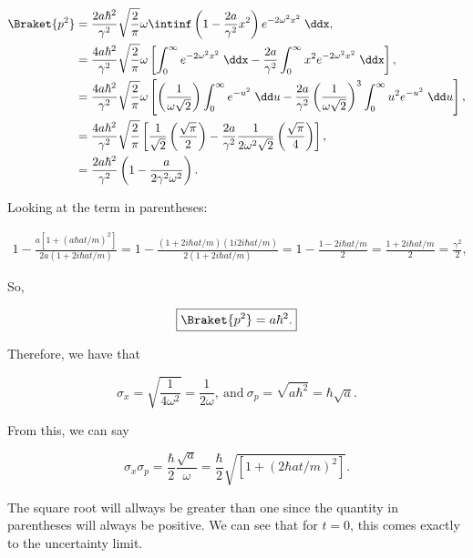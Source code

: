 \begin{parts}
\begin{align*}
    \Braket{p^2} &= \frac{2a\hbar^2}{\gamma^2} \sqrt{\frac{2}{\pi}} \omega \intinf \left( 1 - \frac{2a}{\gamma^2}x^2 \right)e^{-2\omega^2x^2}\;\ddx, \\
    &= \frac{4a\hbar^2}{\gamma^2} \sqrt{\frac{2}{\pi}} \omega \left[ \int_0^{\infty} e^{-2\omega^2x^2}\;\ddx -\frac{2a}{\gamma^2}\int_0^{\infty}x^2e^{-2\omega^2x^2}\;\ddx \right], \\
    &= \frac{4a\hbar^2}{\gamma^2} \sqrt{\frac{2}{\pi}} \omega \left[ \left( \frac{1}{\omega\sqrt{2}} \right) \int_0^{\infty} e^{-u^2}\;\dd u - \frac{2a}{\gamma^2}\left( \frac{1}{\omega\sqrt{2}} \right)^3 \int_0^{\infty} u^2e^{-u^2}\;\dd u \right], \\
    &= \frac{4a\hbar^2}{\gamma^2} \sqrt{\frac{2}{\pi}} \left[ \frac{1}{\sqrt{2}}\left( \frac{\sqrt{\pi}}{2} \right) -  \frac{2a}{\gamma^2} \frac{1}{2\omega^2\sqrt{2}}\left( \frac{\sqrt{\pi}}{4} \right) \right], \\
    &= \frac{2a\hbar^2}{\gamma^2} \left( 1 - \frac{a}{2\gamma^2\omega^2} \right).
\end{align*}

Looking at the term in parentheses:

\begin{align*}
    1 - \frac{a\left[ 1+(a\hbar at/m)^2 \right]}{2a(1+2i\hbar at/m)} = 1- \frac{(1+2i\hbar at/m)(1i2i\hbar at/m)}{2(1+2i\hbar at/m)} = 1- \frac{1-2i\hbar at/m}{2} = \frac{1+2i\hbar at/m}{2} = \frac{\gamma^2}{2},
\end{align*}

So,

\begin{equation*}
    \boxed{\Braket{p^2} = a\hbar^2.}
\end{equation*}

Therefore, we have that

\begin{equation*}
    \sigma_x = \sqrt{\frac{1}{4\omega^2}} = \frac{1}{2\omega}, \ \mathrm{and} \ \sigma_p = \sqrt{a\hbar^2} = \hbar \sqrt{a}.
\end{equation*}


\item From this, we can say

\begin{equation*}
    \sigma_x\sigma_p = \frac{\hbar}{2}\frac{\sqrt{a}}{\omega} = \frac{\hbar}{2} \sqrt{[1+(2\hbar at/m)^2]}.
\end{equation*}

The square root will allways be greater than one since the quantity in parentheses will always be positive. We can see that for $t=0$, this comes exactly to the uncertainty limit.


\end{parts}